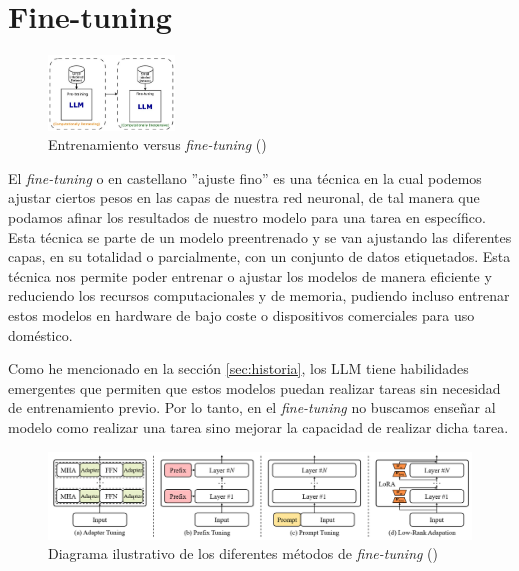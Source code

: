 \section{Fine-tuning}
\label{sec:fine_tuning}


\begin{figure}
    \centering
    \includegraphics[width=0.3\textwidth]{figuras/Capitulo_03/TrainVSFinetuning.png}
    \caption[Entrenamiento versus \textit{fine-tuning}]{Entrenamiento versus \textit{fine-tuning} (\cite{SupervisedFineTuning})}
    \label{fig:finetuningVStraining}
\end{figure}

El \textit{fine-tuning} o en castellano ''ajuste fino'' es una técnica en la cual podemos ajustar
ciertos pesos en las capas de nuestra red neuronal, de tal manera que podamos afinar los
resultados de nuestro modelo para una tarea en específico. Esta técnica se parte de un
modelo preentrenado y se van ajustando las diferentes capas, en su totalidad o parcialmente,
con un conjunto de datos etiquetados. Esta técnica nos permite poder entrenar o ajustar los
modelos de manera eficiente y reduciendo los recursos computacionales y de memoria, pudiendo
incluso entrenar estos modelos en hardware de bajo coste o dispositivos comerciales para
uso doméstico.

Como he mencionado en la sección \ref{sec:historia}, los LLM tiene habilidades emergentes
que permiten que estos modelos puedan realizar tareas sin necesidad de entrenamiento previo.
Por lo tanto, en el \textit{fine-tuning} no buscamos enseñar al modelo como realizar una tarea sino
mejorar la capacidad de realizar dicha tarea. \cite{Finetuning}

\begin{figure}[H]
    \begin{center}
      \includegraphics[width=15cm]{figuras/Capitulo_03/Finetuning.png}
    \end{center}
    \caption[Diagrama ilustrativo de los diferentes métodos de \textit{fine-tuning}]{Diagrama ilustrativo de los diferentes métodos de \textit{fine-tuning} (\cite{Finetuning})}
    \label{fig:finetuning}
\end{figure}

